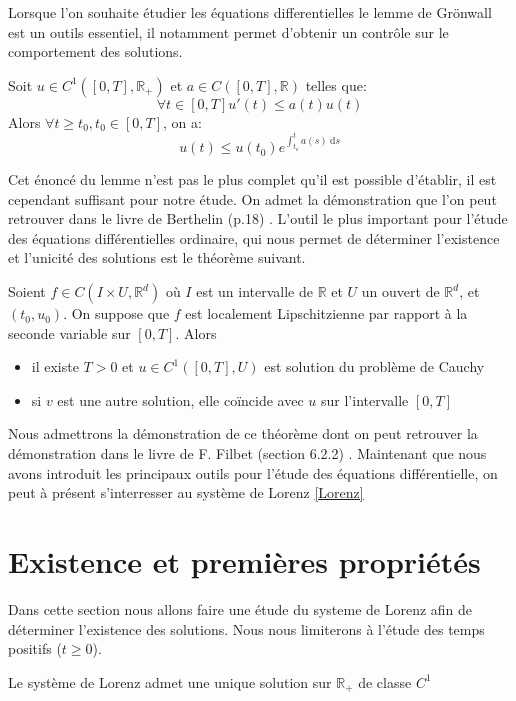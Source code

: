 \documentclass{article}
\newcommand{\R}{\mathbb{R}}
\newtheorem[M , nocut]{prop}{Proposition}[section]
\newtheorem[M , nocut]{definition}{Définition}
\newtheorem[M , nocut]{lemme}{Lemme}
\newtheorem[L , nocut]{thm}{Théoreme}
\newtheorem[M , nocut]{cor}{Corollaire}
\begin{document}
Lorsque l'on souhaite étudier les équations differentielles le lemme de Grönwall est un outils essentiel, il notamment permet d'obtenir un contrôle sur le comportement des solutions.
\begin{lemme}
    \label{lemme:Gronwall}
    Soit $u\in C^1([0,T],\R_+)$ et $a\in C([0,T],\R)$ telles que:
    \[
      \forall t \in [0,T] u'(t)\le a(t)u(t)  
    \]Alors $\forall t \ge t_0, t_0 \in [0,T]$, on a:
    \[
        u(t) \le u(t_0)e^{\int_{t_o}^t a(s)\ \mathrm{d}s}
    \]
\end{lemme}
Cet énoncé du lemme n'est pas le plus complet qu'il est possible d'établir, il est cependant suffisant pour notre étude. On admet la démonstration que l'on peut retrouver dans le livre de Berthelin (p.18) \cite{florent_berthelin_equations_2021}.
L'outil le plus important pour l'étude des équations différentielles ordinaire, qui nous permet de déterminer l'existence et l'unicité des solutions est le théorème suivant.
\begin{thm}
    \label{thm:CL}
    Soient $f\in C(I\times U, \R^d)$ où $I$ est un intervalle de $\R$ et $U$ un ouvert de $\R^d$, et $(t_0,u_0)$. On suppose que $f$ est localement Lipschitzienne par rapport à la seconde variable sur $[0,T]$. Alors 
    \begin{itemize}
        \item il existe $T>0$ et $u\in C^1([0,T],U)$ est solution du problème de Cauchy
        \item si $v$ est une autre solution, elle coïncide avec $u$ sur l'intervalle $[0,T]$
    \end{itemize}
\end{thm}
Nous admettrons la démonstration de ce théorème dont on peut retrouver la démonstration dans le livre de F. Filbet (section 6.2.2) \cite{francis_filbet_analyse_2009}.
Maintenant que nous avons introduit les principaux outils pour l'étude des équations différentielle, on peut à présent s'interresser au système de Lorenz \eqref{Lorenz}

\newpage
\section{Existence et premières propriétés}

Dans cette section nous allons faire une étude du systeme de Lorenz afin de déterminer l'existence des solutions. Nous nous limiterons à l'étude des temps positifs ($t \ge 0$).

\begin{prop}
    Le système de Lorenz admet une unique solution sur $\R_+$ de classe $C^1$
\end{prop}
\end{document}
